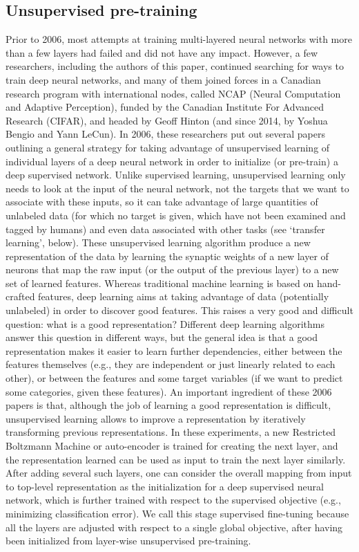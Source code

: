 \documentclass[11pt]{article} %
\begin{document}
\subsection{Unsupervised pre-training}

Prior to 2006, most attempts at training multi-layered neural networks with
more than a few layers had failed and did not have any impact. However, a
few researchers, including the authors of this paper, continued searching
for ways to train deep neural networks, and many of them joined forces in a
Canadian research program with international nodes, called NCAP (Neural
Computation and Adaptive Perception), funded by the Canadian Institute For
Advanced Research (CIFAR), and headed by Geoff Hinton (and since 2014, by
Yoshua Bengio and Yann LeCun). In 2006, these researchers put out several
papers~\citep{Hinton06, Bengio-nips-2006-small,ranzato-07-small} outlining a general strategy for taking advantage of
unsupervised learning of individual layers of a deep neural network in
order to initialize (or pre-train) a deep supervised network. Unlike
supervised learning, unsupervised learning only needs to look at the input
of the neural network, not the targets that we want to associate with these
inputs, so it can take advantage of large quantities of unlabeled data (for
which no target is given, which have not been examined and tagged by
humans) and even data associated with other tasks (see ‘transfer learning’,
below).  These unsupervised learning algorithm produce a new representation
of the data by learning the synaptic weights of a new layer of neurons that
map the raw input (or the output of the previous layer) to a new set of
learned features. Whereas traditional machine learning is based on
hand-crafted features, deep learning aims at taking advantage of data
(potentially unlabeled) in order to discover good features. This raises a
very good and difficult question: what is a good representation? Different
deep learning algorithms answer this question in different ways, but the
general idea is that a good representation makes it easier to learn further
dependencies, either between the features themselves (e.g., they are
independent or just linearly related to each other), or between the
features and some target variables (if we want to predict some categories,
given these features). An important ingredient of these 2006 papers is
that, although the job of learning a good representation is difficult,
unsupervised learning allows to improve a representation by iteratively
transforming previous representations. In these experiments, a new
Restricted Boltzmann Machine or auto-encoder is trained for creating the
next layer, and the representation learned can be used as input to train
the next layer similarly. After adding several such layers, one can
consider the overall mapping from input to top-level representation as the
initialization for a deep supervised neural network, which is further
trained with respect to the supervised objective (e.g., minimizing
classification error). We call this stage supervised fine-tuning because
all the layers are adjusted with respect to a single global objective,
after having been initialized from layer-wise unsupervised pre-training.
\end{document}
